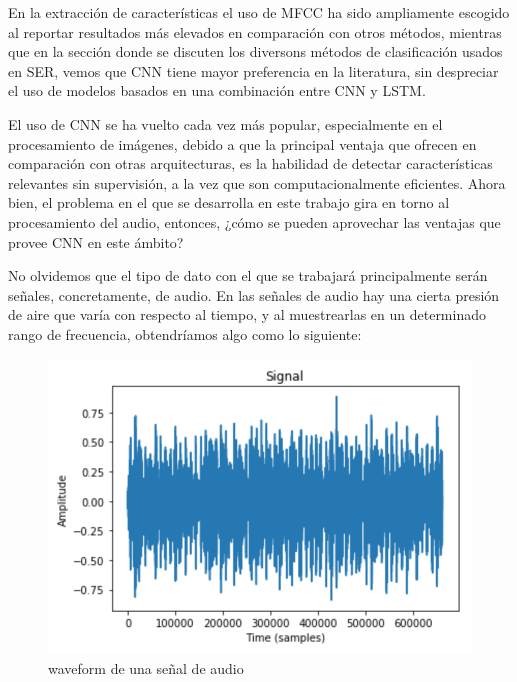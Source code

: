 \documentclass[11pt,a4paper,spanish]{book}
\begin{document}
	En la extracción de características el uso de MFCC ha sido ampliamente escogido al reportar resultados más elevados en comparación con otros métodos, mientras que en la sección donde se discuten los diversons métodos de clasificación usados en SER, vemos que CNN tiene mayor preferencia en la literatura, sin despreciar el uso de modelos basados en una combinación entre CNN y LSTM.\hfill \break
	
	El uso de CNN se ha vuelto cada vez más popular, especialmente en el procesamiento de imágenes, debido a que la principal ventaja que ofrecen en comparación con otras arquitecturas, es la habilidad de detectar características relevantes sin supervisión, a la vez que son computacionalmente eficientes.
	Ahora bien, el problema en el que se desarrolla en este trabajo gira en torno al procesamiento del audio, entonces, ¿cómo se pueden aprovechar las ventajas que provee CNN en este ámbito?

	\newpage
	No olvidemos que el tipo de dato con el que se trabajará principalmente serán señales, concretamente, de audio. En las señales de audio hay una cierta presión de aire que varía con respecto al tiempo, y al muestrearlas en un determinado rango de frecuencia, obtendríamos algo como lo siguiente:
	
	\begin{figure}[H]
		\includegraphics[scale=0.4]{waveform.png}
		\caption{waveform de una señal de audio}
	\end{figure}
\end{document}
